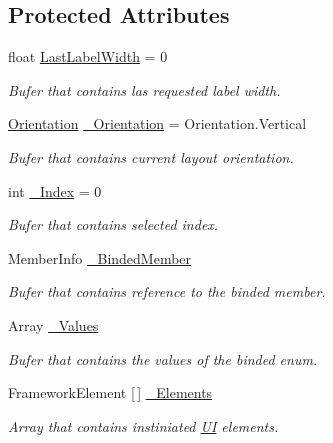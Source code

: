 \subsection*{Protected Attributes}
\begin{DoxyCompactItemize}
\item 
float \mbox{\hyperlink{class_wpf_handler_1_1_u_i_1_1_controls_1_1_flat_toggles_group_ab56d0f33fd489259568de7a64b14487d}{Last\+Label\+Width}} = 0
\begin{DoxyCompactList}\small\item\em Bufer that contains las requested label width. \end{DoxyCompactList}\item 
\mbox{\hyperlink{class_wpf_handler_1_1_u_i_1_1_controls_1_1_flat_toggles_group_ab0cb4350ceae1f1288d6c83de4ed66c9}{Orientation}} \mbox{\hyperlink{class_wpf_handler_1_1_u_i_1_1_controls_1_1_flat_toggles_group_af7f9d34a746082b32a92ae1cb7e338f2}{\+\_\+\+Orientation}} = Orientation.\+Vertical
\begin{DoxyCompactList}\small\item\em Bufer that contains current layout orientation. \end{DoxyCompactList}\item 
int \mbox{\hyperlink{class_wpf_handler_1_1_u_i_1_1_controls_1_1_flat_toggles_group_a559848ddfbcddd8620d9a7783d2a7d04}{\+\_\+\+Index}} = 0
\begin{DoxyCompactList}\small\item\em Bufer that contains selected index. \end{DoxyCompactList}\item 
Member\+Info \mbox{\hyperlink{class_wpf_handler_1_1_u_i_1_1_controls_1_1_flat_toggles_group_a4c0eac437404a019551b6bfd102cc034}{\+\_\+\+Binded\+Member}}
\begin{DoxyCompactList}\small\item\em Bufer that contains reference to the binded member. \end{DoxyCompactList}\item 
Array \mbox{\hyperlink{class_wpf_handler_1_1_u_i_1_1_controls_1_1_flat_toggles_group_afce8c50c94f3417c807a2ba7cce7970f}{\+\_\+\+Values}}
\begin{DoxyCompactList}\small\item\em Bufer that contains the values of the binded enum. \end{DoxyCompactList}\item 
Framework\+Element \mbox{[}$\,$\mbox{]} \mbox{\hyperlink{class_wpf_handler_1_1_u_i_1_1_controls_1_1_flat_toggles_group_ad8b50e4aed5842fb4b3814a281d6cb31}{\+\_\+\+Elements}}
\begin{DoxyCompactList}\small\item\em Array that contains instiniated \mbox{\hyperlink{namespace_wpf_handler_1_1_u_i}{UI}} elements. \end{DoxyCompactList}\end{DoxyCompactItemize}
